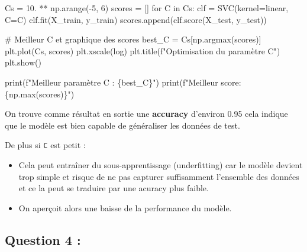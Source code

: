\documentclass[
  letterpaper,
  DIV=11,
  numbers=noendperiod]{scrartcl}
\newenvironment{Shaded}{\begin{snugshade}}{\end{snugshade}}
\newcommand{\BuiltInTok}[1]{\textcolor[rgb]{0.00,0.23,0.31}{#1}}
\newcommand{\CommentTok}[1]{\textcolor[rgb]{0.37,0.37,0.37}{#1}}
\newcommand{\ControlFlowTok}[1]{\textcolor[rgb]{0.00,0.23,0.31}{#1}}
\newcommand{\DecValTok}[1]{\textcolor[rgb]{0.68,0.00,0.00}{#1}}
\newcommand{\FloatTok}[1]{\textcolor[rgb]{0.68,0.00,0.00}{#1}}
\newcommand{\KeywordTok}[1]{\textcolor[rgb]{0.00,0.23,0.31}{#1}}
\newcommand{\NormalTok}[1]{\textcolor[rgb]{0.00,0.23,0.31}{#1}}
\newcommand{\OperatorTok}[1]{\textcolor[rgb]{0.37,0.37,0.37}{#1}}
\newcommand{\SpecialCharTok}[1]{\textcolor[rgb]{0.37,0.37,0.37}{#1}}
\newcommand{\SpecialStringTok}[1]{\textcolor[rgb]{0.13,0.47,0.30}{#1}}
\newcommand{\StringTok}[1]{\textcolor[rgb]{0.13,0.47,0.30}{#1}}
\providecommand{\tightlist}{%
  \setlength{\itemsep}{0pt}\setlength{\parskip}{0pt}}\usepackage{longtable,booktabs,array}
\begin{document}
\begin{Shaded}
\begin{Highlighting}[]
\NormalTok{Cs }\OperatorTok{=} \FloatTok{10.} \OperatorTok{**}\NormalTok{ np.arange(}\OperatorTok{{-}}\DecValTok{5}\NormalTok{, }\DecValTok{6}\NormalTok{)}
\NormalTok{scores }\OperatorTok{=}\NormalTok{ []}
\ControlFlowTok{for}\NormalTok{ C }\KeywordTok{in}\NormalTok{ Cs:}
\NormalTok{    clf }\OperatorTok{=}\NormalTok{ SVC(kernel}\OperatorTok{=}\StringTok{\textquotesingle{}linear\textquotesingle{}}\NormalTok{, C}\OperatorTok{=}\NormalTok{C)}
\NormalTok{    clf.fit(X\_train, y\_train)}
\NormalTok{    scores.append(clf.score(X\_test, y\_test))}

\CommentTok{\# Meilleur C et graphique des scores}
\NormalTok{best\_C }\OperatorTok{=}\NormalTok{ Cs[np.argmax(scores)]}
\NormalTok{plt.plot(Cs, scores)}
\NormalTok{plt.xscale(}\StringTok{\textquotesingle{}log\textquotesingle{}}\NormalTok{)}
\NormalTok{plt.title(}\SpecialStringTok{f"Optimisation du paramètre C"}\NormalTok{)}
\NormalTok{plt.show()}

\BuiltInTok{print}\NormalTok{(}\SpecialStringTok{f"Meilleur paramètre C : }\SpecialCharTok{\{}\NormalTok{best\_C}\SpecialCharTok{\}}\SpecialStringTok{"}\NormalTok{)}
\BuiltInTok{print}\NormalTok{(}\SpecialStringTok{f"Meilleur score: }\SpecialCharTok{\{}\NormalTok{np}\SpecialCharTok{.}\BuiltInTok{max}\NormalTok{(scores)}\SpecialCharTok{\}}\SpecialStringTok{"}\NormalTok{)}
\end{Highlighting}
\end{Shaded}

On trouve comme résultat en sortie une \textbf{accuracy} d'environ 0.95
cela indique que le modèle est bien capable de généraliser les données
de test.

De plus si \texttt{C} est petit :

\begin{itemize}
\tightlist
\item
  Cela peut entraîner du sous-apprentissage (underfitting) car le modèle
  devient trop simple et risque de ne pas capturer suffisamment
  l'ensemble des données et ce la peut se traduire par une acuracy plus
  faible.
\item
  On aperçoit alors une baisse de la performance du modèle.
\end{itemize}

\hypertarget{question-4}{%
\subsection{Question 4 :}\label{question-4}}
\end{document}

